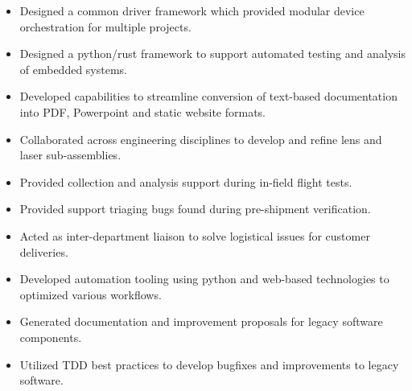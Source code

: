 \documentclass[a4paper,ragged2e,withhyper]{altacv}
\begin{document}
\begin{itemize}
\item Designed a common driver framework which provided modular device orchestration for multiple projects.\\
\item Designed a python/rust framework to support automated testing and analysis of embedded systems.\\
\item Developed capabilities to streamline conversion of text-based documentation into PDF, Powerpoint and static website formats.\\
\item Collaborated across engineering disciplines to develop and refine lens and laser sub-assemblies.\\
\item Provided collection and analysis support during in-field flight tests.\\
\end{itemize}

\divider


\begin{itemize}
\item Provided support triaging bugs found during pre-shipment verification.\\
\item Acted as inter-department liaison to solve logistical issues for customer deliveries.\\
\item Developed automation tooling using python and web-based technologies to optimized various workflows.\\
\item Generated documentation and improvement proposals for legacy software components.\\
\item Utilized TDD best practices to develop bugfixes and improvements to legacy software.\\
\end{itemize}

\divider
\end{document}
